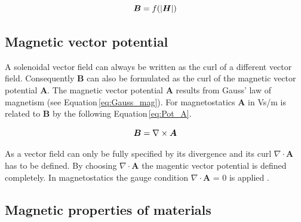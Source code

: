 \begin{equation}
\label{eq:nonlin_B}
\centering
\boldsymbol{B} = f(\vert\boldsymbol{H}\vert)
\end{equation}

\subsection{Magnetic vector potential}
\label{subsec:Mag_pot}
A solenoidal vector field can always be written as the curl of a different vector field. Consequently $\boldsymbol{B}$ can also be formulated as the curl of the magnetic vector potential $\boldsymbol{A}$. The magnetic vector potential $\boldsymbol{A}$ results from Gauss' law of magnetism (see Equation\,\ref{eq:Gauss_mag}). For magnetostatics $\boldsymbol{A}$ in Vs/m is related to $\boldsymbol{B}$ by the following Equation\,\ref{eq:Pot_A}.  

\begin{equation}
\label{eq:Pot_A}
\centering
\boldsymbol{B} = \nabla\times\boldsymbol{A}
\end{equation}

As a vector field can only be fully specified by its divergence and its curl $\nabla\cdotp\boldsymbol{A}$ has to be defined. By choosing $\nabla\cdotp\boldsymbol{A}$ the magentic vector potential is defined completely. In magnetostatics the gauge condition $\nabla\cdotp\boldsymbol{A}$ = 0 is applied \cite{schwab2013begriffswelt}.   

\subsection{Magnetic properties of materials}
\label{subsec:Mag_mat}



